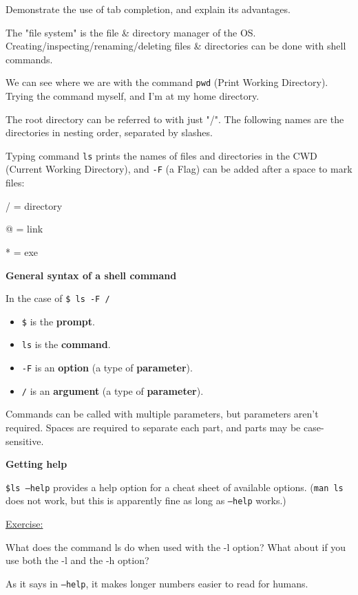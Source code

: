\documentclass[12pt]{article}
\begin{document}
Demonstrate the use of tab completion, and explain its advantages.
\color{black}

\vspace{1em}
The "file system" is the file \& directory manager of the OS. Creating/inspecting/renaming/deleting files \& directories can be done with shell commands.

We can see where we are with the command \texttt{pwd} (Print Working Directory). Trying the command myself, and I'm at my home directory.

The root directory can be referred to with just "/". The following names are the directories in nesting order, separated by slashes.

Typing command \texttt{ls} prints the names of files and directories in the CWD (Current Working Directory), and \texttt{-F} (a Flag) can be added after a space to mark files:

/ = directory

@ = link

* = exe

\newpage
\textbf{General syntax of a shell command}

In the case of \texttt{\$ ls -F /}\begin{itemize}
    \item \texttt{\$} is the \textbf{prompt}. 
    \item \texttt{ls} is the \textbf{command}.
    \item \texttt{-F} is an \textbf{option} (a type of \textbf{parameter}).
    \item \texttt{/} is an \textbf{argument} (a type of \textbf{parameter}).
\end{itemize}

Commands can be called with multiple parameters, but parameters aren't required. Spaces are required to separate each part, and parts may be case-sensitive.

\vspace{1em}
\textbf{Getting help}

\texttt{\$ls --help} provides a help option for a cheat sheet of available options. (\texttt{man ls} does not work, but this is apparently fine as long as \texttt{--help} works.)

\vspace{1em}
\color{gray}\begin{addmargin}[1cm]{0cm}
\underline{Exercise:}

What does the command ls do when used with the -l option? What about if you use both the -l and the -h option?

\color{black}

As it says in \texttt{--help}, it makes longer numbers easier to read for humans.

\end{addmargin}
\end{document}
